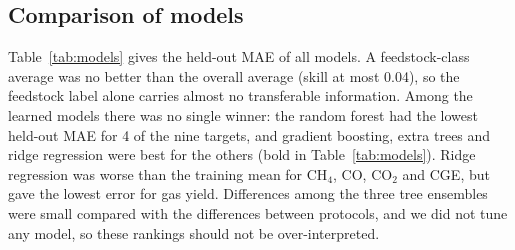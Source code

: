 \documentclass[11pt,a4paper]{article}
\begin{document}
\subsection{Comparison of models}
Table~\ref{tab:models} gives the held-out MAE of all models. A feedstock-class average was no better than the overall average (skill at most 0.04), so the feedstock label alone carries almost no transferable information. Among the learned models there was no single winner: the random forest had the lowest held-out MAE for 4 of the nine targets, and gradient boosting, extra trees and ridge regression were best for the others (bold in Table~\ref{tab:models}). Ridge regression was worse than the training mean for CH$_4$, CO, CO$_2$ and CGE, but gave the lowest error for gas yield. Differences among the three tree ensembles were small compared with the differences between protocols, and we did not tune any model, so these rankings should not be over-interpreted.

\begin{table}[H]\centering\footnotesize\caption{Held-out MAE (leave-one-publication-out) of all models; bold = lowest among the four learned models.}\label{tab:models}
\end{table}
\end{document}
